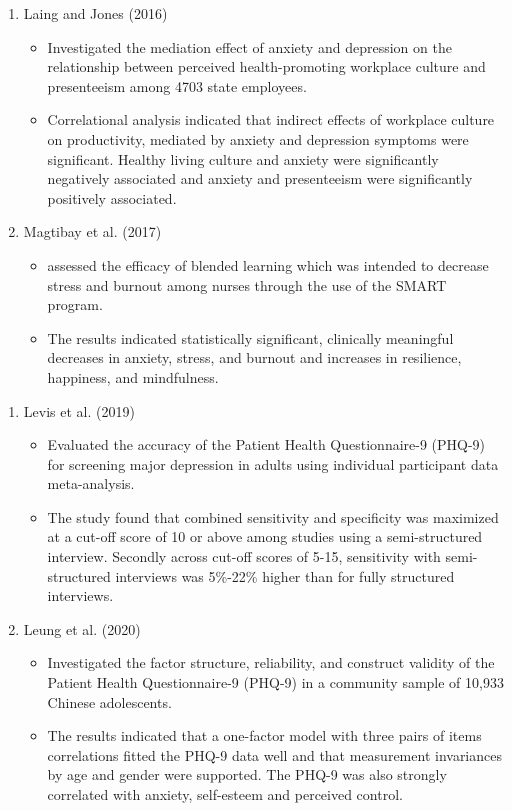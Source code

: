 \documentclass{beamer}
\newcounter{saveenumi}
\newcommand{\seti}{\setcounter{saveenumi}{\value{enumi}}}
\newcommand{\conti}{\setcounter{enumi}{\value{saveenumi}}}
\numberwithin{equation}{section}
\numberwithin{table}{section}
\begin{document}
\begin{frame}
\begin{enumerate}
	\conti
	\item Laing and Jones (2016)
\begin{itemize}
\item  Investigated the mediation effect of anxiety and depression on the relationship between perceived health-promoting workplace culture and presenteeism among 4703 state employees.
\item  Correlational analysis indicated that indirect effects of workplace culture on productivity, mediated by anxiety and depression symptoms were significant. Healthy living culture and anxiety were significantly negatively associated and anxiety and presenteeism were significantly positively associated.
\end{itemize}
\item Magtibay et al. (2017)
\begin{itemize}
	\item assessed the efficacy of blended learning which was intended to decrease stress and burnout among nurses through the use of the SMART program.
	\item  The results indicated statistically significant, clinically meaningful decreases in anxiety, stress, and burnout and increases in resilience, happiness, and mindfulness.
\end{itemize}
\seti
\end{enumerate}
\end{frame}
\begin{frame}
	\begin{enumerate}
		\conti
		\item Levis et al. (2019)
		\begin{itemize}
			\item Evaluated the accuracy of the Patient Health Questionnaire-9 (PHQ-9) for screening major depression in adults using individual participant data meta-analysis.
			\item The study found that combined sensitivity and specificity was maximized at a cut-off score of 10 or above among studies using a semi-structured interview. Secondly across cut-off scores of 5-15, sensitivity with semi-structured interviews was 5\%-22\% higher than for fully structured interviews.
		\end{itemize}
	\item Leung et al. (2020)
	\begin{itemize}
		\item Investigated the factor structure, reliability, and construct validity of the Patient Health Questionnaire-9 (PHQ-9) in a community sample of 10,933 Chinese adolescents.
		\item The results indicated that a one-factor model with three pairs of items correlations fitted the PHQ-9 data well and that measurement invariances by age and gender were supported. The PHQ-9 was also strongly correlated with anxiety, self-esteem and perceived control.
	\end{itemize}
	\seti
	\end{enumerate}
\end{frame}
\end{document}
